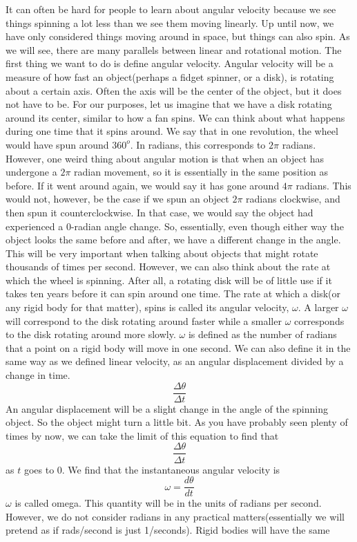 \newline

It can often be hard for people to learn about angular velocity because we see things spinning a lot less than we see them moving linearly. Up until now, we have only considered things moving around in space, but things can also spin. As we will see, there are many parallels between linear and rotational motion. The first thing we want to do is define angular velocity. Angular velocity will be a measure of how fast an object(perhaps a fidget spinner, or a disk), is rotating about a certain axis. Often the axis will be the center of the object, but it does not have to be. For our purposes, let us imagine that we have a disk rotating around its center, similar to how a fan spins. We can think about what happens during one time that it spins around. We say that in one revolution, the wheel would have spun around $360^o$. In radians, this corresponds to $2\pi$ radians. However, one weird thing about angular motion is that when an object has undergone a $2\pi$ radian movement, so it is essentially in the same position as before. If it went around again, we would say it has gone around $4\pi$ radians. This would not, however, be the case if we spun an object $2\pi$ radians clockwise, and then spun it counterclockwise. In that case, we would say the object had experienced a 0-radian angle change. So, essentially, even though either way the object looks the same before and after, we have a different change in the angle. This will be very important when talking about objects that might rotate thousands of times per second. However, we can also think about the rate at which the wheel is spinning. After all, a rotating disk will be of little use if it takes ten years before it can spin around one time. The rate at which a disk(or any rigid body for that matter), spins is called its angular velocity, $\omega$. A larger $\omega$ will correspond to the disk rotating around faster while a smaller $\omega$ corresponds to the disk rotating around more slowly. $\omega$ is defined as the number of radians that a point on a rigid body will move in one second. We can also define it in the same way as we defined linear velocity, as an angular displacement divided by a change in time. $$\frac{\Delta \theta}{\Delta t}$$ An angular displacement will be a slight change in the angle of the spinning object. So the object might turn a little bit. As you have probably seen plenty of times by now, we can take the limit of this equation to find that $$\frac{\Delta \theta}{\Delta t}$$ as $t$ goes to 0. We find that the instantaneous angular velocity is \begin{equation}\omega=\frac{d\theta}{dt}\end{equation} $\omega$ is called omega. This quantity will be in the units of radians per second. However, we do not consider radians in any practical matters(essentially we will pretend as if rads/second is just 1/seconds). Rigid bodies will have the same 